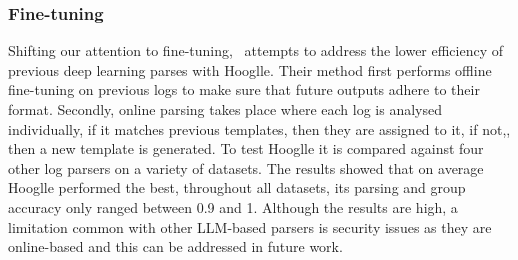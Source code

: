 \subsubsection{Fine-tuning}
Shifting our attention to fine-tuning,~\cite{chen2024high} attempts to address the lower efficiency of previous deep learning parses with Hooglle. Their method first performs offline fine-tuning on previous logs to make sure that future outputs adhere to their format. Secondly, online parsing takes place where each log is analysed individually, if it matches previous templates, then they are assigned to it, if not,, then a new template is generated. To test Hooglle it is compared against four other log parsers on a variety of datasets. The results showed that on average Hooglle performed the best, throughout all datasets, its parsing and group accuracy only ranged between 0.9 and 1. Although the results are high, a limitation common with other LLM-based parsers is security issues as they are online-based and this can be addressed in future work.

